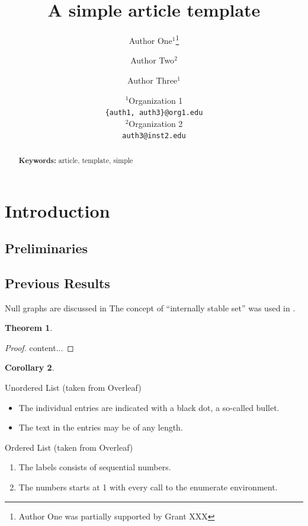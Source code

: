 \documentclass[a4paper]{article}
\title{A simple article template}
\author{Author One$^1$\thanks{Author One was partially supported by Grant XXX} \and Author Two$^2$ \and Author Three$^1$}
\date{
	$^1$Organization 1 \\ \texttt{\{auth1, auth3\}@org1.edu}\\%
	$^2$Organization 2 \\ \texttt{auth3@inst2.edu}\\[2ex]%
}
\theoremstyle{plain}
\newtheorem{theorem}{Theorem}
\newtheorem{corollary}[theorem]{Corollary}
\theoremstyle{definition}
\begin{document}
	\maketitle
	
	\begin{abstract}
		\lipsum[1]
		
		\noindent\textbf{Keywords:} article, template, simple
	\end{abstract}

	\tableofcontents
	
	\section{Introduction}
	\label{sec:intro}
	
	\lipsum[2]
	
	\subsection{Preliminaries}
	\label{sec:pre}
	
	\lipsum[3]
	
	\subsection{Previous Results}
	\label{sec:prev-results}
	
	Null graphs are discussed in \cite{HararyR74}
	The concept of ``internally stable set'' was used in \cite{Berge57, Berge58}.
	
	\begin{theorem}
		\label{thrm:1}
		\lipsum[4]
	\end{theorem}
	\begin{proof}
		content...
	\end{proof}

	\begin{corollary}
	\label{cor:1}
	
	\lipsum[5]
	\end{corollary}

	Unordered List (taken from Overleaf)
	\begin{itemize}
		\item The individual entries are indicated with a black dot, a so-called bullet.
		\item The text in the entries may be of any length.
	\end{itemize}

	Ordered List (taken from Overleaf)
	\begin{enumerate}
		\item The labels consists of sequential numbers.
		\item The numbers starts at 1 with every call to the enumerate environment.
	\end{enumerate}
\end{document}

